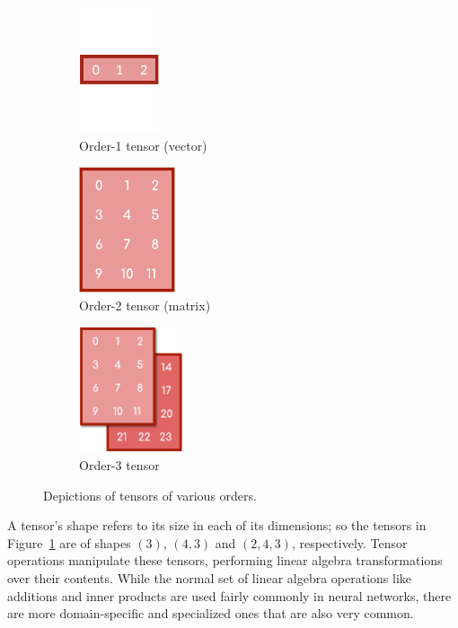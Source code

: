 \begin{figure}[ht]
	\centering
	\begin{subfigure}{.33\textwidth}
		\centering
		\includegraphics[height=10em]{tensors/order1}
		\caption{Order-1 tensor (vector)}
	\end{subfigure}
	\begin{subfigure}{.33\textwidth}
		\centering
		\includegraphics[height=10em]{tensors/order2}
		\caption{Order-2 tensor (matrix)}
	\end{subfigure}
	\begin{subfigure}{.3\textwidth}
		\centering
		\includegraphics[height=10em]{tensors/order3}
		\caption{Order-3 tensor}
	\end{subfigure}
	\caption[Depictions of tensors of various orders]{Depictions of tensors of various orders.}
	\label{fig:tensor_orders}
\end{figure}

A tensor's shape refers to its size in each of its dimensions; so the tensors in Figure~\ref{fig:tensor_orders} are of shapes $(3)
$, $(4,3)$ and $(2,4,3)$, respectively. Tensor operations manipulate these tensors, performing linear algebra transformations
over their contents. While the normal set of linear algebra operations like additions and inner products are used fairly commonly in neural networks, there are more domain-specific and specialized ones that are also very common.


